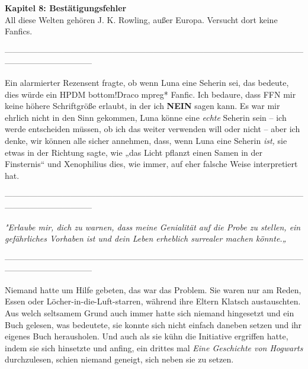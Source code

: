 

\hypertarget{bestuxe4tigungsfehler}{%

\textbf{Kapitel 8: Bestätigungsfehler}\\

\hfill\break All diese Welten gehören J. K. Rowling, außer Europa. Versucht dort keine Fanfics.

--------------------------------------------------------------------------------------------------------------------------------------------

\hfill\break Ein alarmierter Rezensent fragte, ob wenn Luna eine Seherin sei, das bedeute, dies würde ein HPDM bottom!Draco mpreg* Fanfic. Ich bedaure, dass FFN mir keine höhere Schriftgröße erlaubt, in der ich \textbf{NEIN} sagen kann. Es war mir ehrlich nicht in den Sinn gekommen, Luna könne eine \emph{echte} Seherin sein -- ich werde entscheiden müssen, ob ich das weiter verwenden will oder nicht -- aber ich denke, wir können alle sicher annehmen, dass, wenn Luna eine Seherin \emph{ist,} sie etwas in der Richtung sagte, wie „das Licht pflanzt einen Samen in der Finsternis“ und Xenophilius dies, wie immer, auf eher falsche Weise interpretiert hat.

--------------------------------------------------------------------------------------------------------------------------------------------

\hfill\break

\emph{"Erlaube mir, dich zu warnen, dass meine Genialität auf die Probe zu stellen, ein gefährliches Vorhaben ist und dein Leben erheblich surrealer machen könnte.„}

--------------------------------------------------------------------------------------------------------------------------------------------

\hfill\break Niemand hatte um Hilfe gebeten, das war das Problem. Sie waren nur am Reden, Essen oder Löcher-in-die-Luft-starren, während ihre Eltern Klatsch austauschten. Aus welch seltsamem Grund auch immer hatte sich niemand hingesetzt und ein Buch gelesen, was bedeutete, sie konnte sich nicht einfach daneben setzen und ihr eigenes Buch herausholen. Und auch als sie kühn die Initiative ergriffen hatte, indem sie sich hinsetzte und anfing, ein drittes mal \emph{Eine Geschichte von Hogwarts} durchzulesen, schien niemand geneigt, sich neben sie zu setzen.

}
